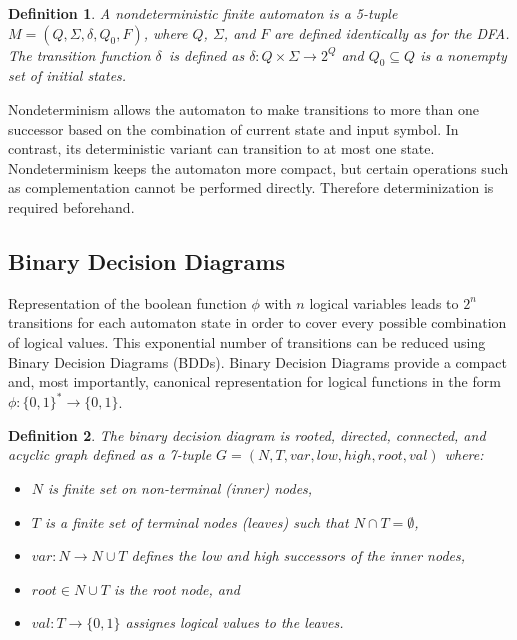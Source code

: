 \documentclass[pdflatex,sn-mathphys-num]{sn-jnl}%
\theoremstyle{thmstyleone}%
\theoremstyle{thmstyletwo}%
\theoremstyle{thmstylethree}%
\newtheorem{definition}{Definition}%
\begin{document}
        \begin{definition}
            A nondeterministic finite automaton is a 5-tuple $M = (Q, \Sigma, \delta, Q_0, F)$, where $Q$, $\Sigma$, and $F$ are defined identically as for the DFA. The transition function $\delta$~is defined as $\delta : Q \times \Sigma \rightarrow 2^{Q}$ and $Q_0 \subseteq Q$ is a nonempty set of initial states.
        \end{definition}

        Nondeterminism allows the automaton to make transitions to more than one successor based on the combination of current state and input symbol. In contrast, its deterministic variant can transition to at most one state. Nondeterminism keeps the automaton more compact, but certain operations such as complementation cannot be performed directly. Therefore determinization is required beforehand.

    \subsection{Binary Decision Diagrams}
        Representation of the boolean function $\phi$ with $n$ logical variables leads to $2^n$ transitions for each automaton state in order to cover every possible combination of logical values. This exponential number of transitions can be reduced using Binary Decision Diagrams (BDDs). Binary Decision Diagrams provide a compact and, most importantly, canonical representation for logical functions in the form $\phi: \{0, 1\}^* \rightarrow \{0, 1\}$.

        \vspace*{0.5em}

        \begin{definition}
            The binary decision diagram \cite{BDD} is rooted, directed, connected, and acyclic graph defined as a 7-tuple $G = (N, T, var, low, high, root, val)$ where:
            \begin{itemize}[noindent]
                \item $N$ is finite set on non-terminal (inner) nodes,
                \item $T$ is a finite set of terminal nodes (leaves) such that $N \cap T = \emptyset$,
                \item $var : N \rightarrow N \cup T$ defines the low and high successors of the inner nodes,
                \item $root \in N \cup T$ is the root node, and
                \item $val : T \rightarrow \{0, 1\}$ assignes logical values to the leaves.
            \end{itemize}
        \end{definition}
\end{document}
